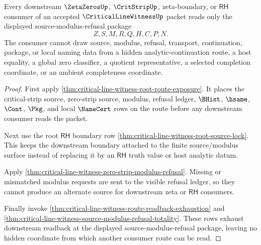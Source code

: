 \begin{theorem}
\label{thm:critical-line-witness-downstream-readback-exhaustion}
Every downstream $\ZetaZerosUp$, $\CritStripUp$, zeta-boundary, or $\mathsf{RH}$ consumer of an accepted $\CriticalLineWitnessUp$ packet reads only the displayed source-modulus-refusal package
$$
Z,S,M,R,Q,H,C,P,N.
$$
The consumer cannot draw source, modulus, refusal, transport, continuation, package, or local naming data from a hidden analytic-continuation route, a host equality, a global zero classifier, a quotient representative, a selected completion coordinate, or an ambient completeness coordinate.
\end{theorem}
\begin{proof}
First apply \autoref{thm:critical-line-witness-root-route-exposure}. It places the critical-strip source, zero-strip source, modulus, refusal ledger, $\BHist$, $\hsame$, $\Cont$, $\Pkg$, and local $\NameCert$ rows on the route before any downstream consumer reads the packet.

Next use the root $\mathsf{RH}$ boundary row \autoref{thm:critical-line-witness-root-source-lock}. This keeps the downstream boundary attached to the finite source/modulus surface instead of replacing it by an $\mathsf{RH}$ truth value or host analytic datum.

Apply \autoref{thm:critical-line-witness-zero-strip-modulus-refusal}. Missing or mismatched modulus requests are sent to the visible refusal ledger, so they cannot produce an alternate source for downstream zeta or $\mathsf{RH}$ consumers.

Finally invoke \autoref{thm:critical-line-witness-route-readback-exhaustion} and \autoref{thm:critical-line-witness-source-modulus-refusal-totality}. These rows exhaust downstream readback at the displayed source-modulus-refusal package, leaving no hidden coordinate from which another consumer route can be read.
\end{proof}
